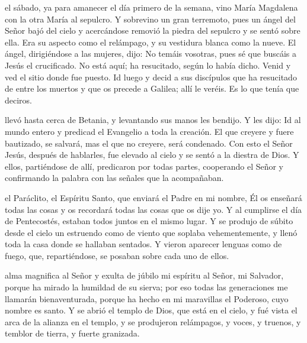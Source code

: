 \documentclass[10pt,oneside]{book}
\begin{document}
el sábado, ya para amanecer el día primero de la semana, vino María Magdalena con la otra María al sepulcro. Y sobrevino un gran terremoto,
pues un ángel del Señor bajó del cielo y acercándose removió la piedra del sepulcro y se sentó sobre ella. Era su aspecto como el relámpago, y su vestidura blanca como la nueve.
El ángel, dirigiéndose a las mujeres, dijo: No temáis vosotras, pues sé que buscáis a Jesús el crucificado. No está aquí; ha resucitado, según lo había dicho.
Venid y ved el sitio donde fue puesto. Id luego y decid a sus discípulos que ha resucitado de entre los muertos y que os precede a Galilea; allí le veréis.
Es lo que tenía que deciros.\\[2mm]

\vspace{5mm}

llevó hasta cerca de Betania, y levantando sus manos les bendijo. Y les dijo: Id al mundo entero y predicad el Evangelio a toda la creación.
El que creyere y fuere bautizado, se salvará, mas el que no creyere, será condenado. Con esto el Señor Jesús, después de hablarles, fue elevado al cielo y se sentó a la diestra de Dios.
Y ellos, partiéndose de allí, predicaron por todas partes, cooperando el Señor y confirmando la palabra con las señales que la acompañaban.

\begin{center}
      
\end{center}

el Paráclito, el Espíritu Santo, que enviará el Padre en mi nombre, Él os enseñará todas las cosas y os recordará todas las cosas que os dije yo.
Y al cumplirse el día de Pentecostés, estaban todos juntos en el mismo lugar. Y se produjo de súbito desde el cielo un estruendo como de viento que soplaba vehementemente,
y llenó toda la casa donde se hallaban sentados. Y vieron aparecer lenguas como de fuego, que, repartiéndose, se posaban sobre cada uno de ellos. 

\begin{center}
      
\end{center}

alma magnifica al Señor y exulta de júbilo mi espíritu al Señor, mi Salvador, porque ha mirado la humildad de su sierva;
por eso todas las generaciones me llamarán bienaventurada, porque ha hecho en mi maravillas el Poderoso, cuyo nombre es santo. Y se abrió el templo de Dios, que está en el cielo,
y fué vista el arca de la alianza en el templo, y se produjeron relámpagos, y voces, y truenos, y temblor de tierra, y fuerte granizada.
\end{document}
